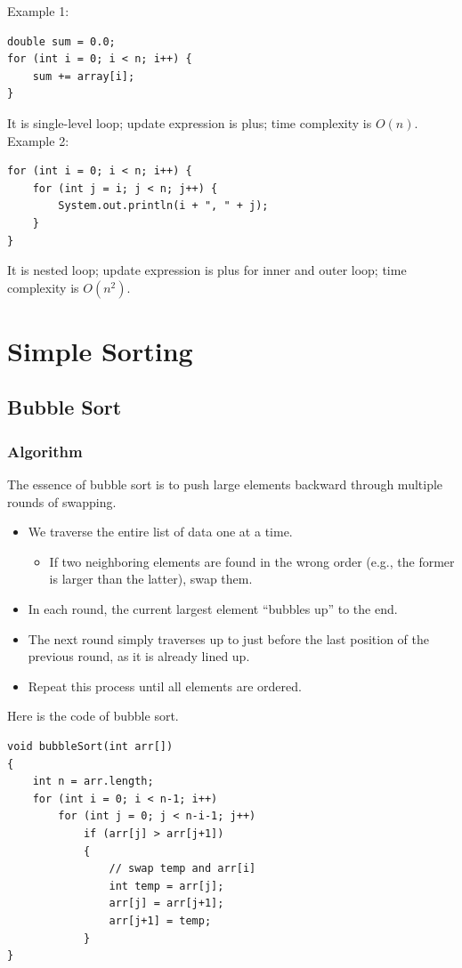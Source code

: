 \documentclass[letterpaper,12pt]{article}
\begin{document}
Example 1:
\begin{verbatim}
double sum = 0.0;
for (int i = 0; i < n; i++) {
    sum += array[i];
}
\end{verbatim}
It is single-level loop; update expression is plus; time complexity is $O(n)$.\\
Example 2:
\begin{verbatim}
for (int i = 0; i < n; i++) {
    for (int j = i; j < n; j++) {
        System.out.println(i + ", " + j);
    }
}
\end{verbatim}
It is nested loop; update expression is plus for inner and outer loop; time complexity is $O(n^2)$.

\section{Simple Sorting}
\subsection{Bubble Sort}
\subsubsection{Algorithm}
The essence of bubble sort is to push large elements backward through multiple rounds of swapping.
\begin{itemize}
    \item We traverse the entire list of data one at a time.
    \begin{itemize}
        \item If two neighboring elements are found in the wrong order (e.g., the former is larger than the latter), swap them.
    \end{itemize}
    \item In each round, the current largest element “bubbles up” to the end.
    \item The next round simply traverses up to just before the last position of the previous round, as it is already lined up.
    \item Repeat this process until all elements are ordered.
\end{itemize}
Here is the code of bubble sort.
\begin{verbatim}
void bubbleSort(int arr[])
{
    int n = arr.length;
    for (int i = 0; i < n-1; i++)
        for (int j = 0; j < n-i-1; j++)
            if (arr[j] > arr[j+1])
            {
                // swap temp and arr[i]
                int temp = arr[j];
                arr[j] = arr[j+1];
                arr[j+1] = temp;
            }
}
\end{verbatim}
\end{document}
